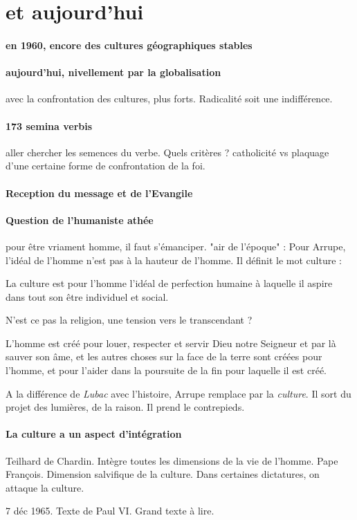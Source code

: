 \section{et aujourd'hui}

\paragraph{en 1960, encore des cultures géographiques stables}

\paragraph{aujourd'hui, nivellement par la globalisation} avec la confrontation des cultures, plus forts. Radicalité soit une indifférence.

\paragraph{173 semina verbis} aller chercher les semences du verbe. Quels critères ? catholicité vs plaquage d'une certaine forme de confrontation de la foi. 


\paragraph{Reception du message et de l'Evangile}

\paragraph{Question de l'humaniste athée} pour être vriament homme, il faut s'émanciper. "air de l'époque" : Pour Arrupe, l'idéal de l'homme n'est pas à la hauteur de l'homme. Il définit le mot culture : 
\begin{Def}[culture]
    La culture est pour l'homme l'idéal de perfection humaine à laquelle il aspire dans tout son être individuel et social.
\end{Def}
N'est ce pas la religion, une tension vers le transcendant ?
\begin{Ex}
    L’homme est créé
pour louer, respecter et servir Dieu notre Seigneur
et par là sauver son âme,
et les autres choses sur la face de la terre
sont créées pour l’homme,
et pour l’aider dans la poursuite de la fin
pour laquelle il est créé.
\end{Ex}

A la différence de \textit{Lubac} avec l'histoire, Arrupe remplace par la \textit{culture}. Il sort du projet des lumières, de la raison. Il prend le contrepieds. 

\paragraph{La culture a un aspect d'intégration} Teilhard de Chardin. Intègre toutes les dimensions de la vie de l'homme. Pape François. Dimension salvifique de la culture.
Dans certaines dictatures, on attaque la culture. 


7 déc 1965. Texte de Paul VI. Grand texte à lire.
